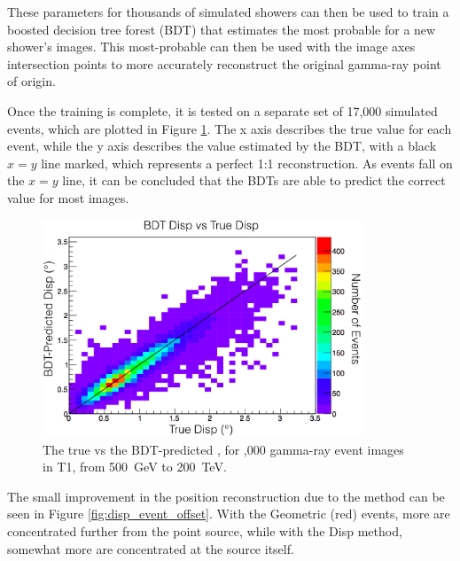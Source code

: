    These parameters for thousands of simulated showers can then be used to train a boosted decision tree forest (BDT) that estimates the most probable \disp{} for a new shower's images.
    This most-probable \disp{} can then be used with the image axes intersection points to more accurately reconstruct the original gamma-ray point of origin.
    
    Once the training is complete, it is tested on a separate set of 17,000 simulated events, which are plotted in Figure \ref{fig:disptraining}.
    The x axis describes the true \disp{} value for each event, while the y axis describes the \disp{} value estimated by the BDT, with a black $x=y$ line marked, which represents a perfect 1:1 \disp{} reconstruction.
    As events fall on the $x=y$ line, it can be concluded that the BDTs are able to predict the correct \disp{} value for most images.

    \begin{figure}[ht]
      \centering
      \includegraphics[width=0.85\textwidth]{images/disp_training.eps}
      \caption[Disp BDT Training]{
        The true \disp{} vs the BDT-predicted \disp{}, for ,000 gamma-ray event images in T1, from \SI{500}{\GeV} to \SI{200}{\TeV}.
      }
      \label{fig:disptraining}
    \end{figure}

    The small improvement in the position reconstruction due to the \disp{} method can be seen in Figure \ref{fig:disp_event_offset}.
    With the Geometric (red) events, more are concentrated further from the point source, while with the Disp method, somewhat more are concentrated at the source itself.

